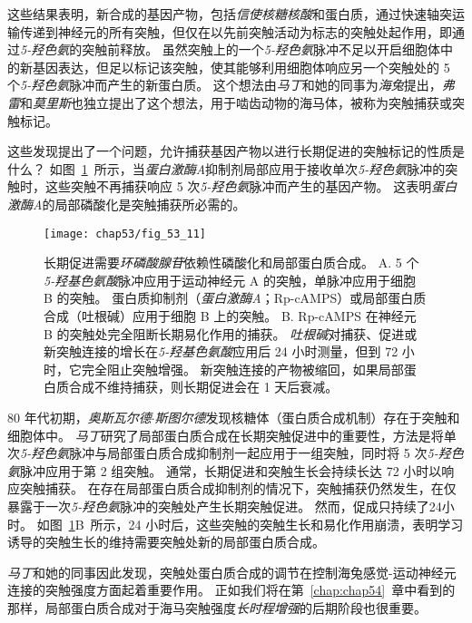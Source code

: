 这些结果表明，新合成的基因产物，包括\textit{信使核糖核酸}和蛋白质，通过快速轴突运输传递到神经元的所有突触，但仅在以先前突触活动为标志的突触处起作用，即通过\textit{5-羟色氨}的突触前释放。
虽然突触上的一个\textit{5-羟色氨}脉冲不足以开启细胞体中的新基因表达，但足以标记该突触，使其能够利用细胞体响应另一个突触处的 5 个\textit{5-羟色氨}脉冲而产生的新蛋白质。
这个想法由\textit{马丁}和她的同事为\textit{海兔}提出，\textit{弗雷}和\textit{莫里斯}也独立提出了这个想法，用于啮齿动物的海马体，被称为突触捕获或突触标记。


这些发现提出了一个问题，允许捕获基因产物以进行长期促进的突触标记的性质是什么？
如图~\ref{fig:53_11}~所示，当\textit{蛋白激酶A}抑制剂局部应用于接收单次\textit{5-羟色氨}脉冲的突触时，这些突触不再捕获响应 5 次\textit{5-羟色氨}脉冲而产生的基因产物。
这表明\textit{蛋白激酶A}的局部磷酸化是突触捕获所必需的。


\begin{figure}[htbp]
	\centering
	\texttt{[image: chap53/fig\_53\_11]}
	\caption{长期促进需要\textit{环磷酸腺苷}依赖性磷酸化和局部蛋白质合成\cite{casadio1999transient}。
		A. 5 个\textit{5-羟基色氨酸}脉冲应用于运动神经元 A 的突触，单脉冲应用于细胞 B 的突触。
		蛋白质抑制剂（\textit{蛋白激酶A}；Rp-cAMPS）或局部蛋白质合成（吐根碱）应用于细胞 B 上的突触。
		B. Rp-cAMPS 在神经元 B 的突触处完全阻断长期易化作用的捕获。
		\textit{吐根碱}对捕获、促进或新突触连接的增长在\textit{5-羟基色氨酸}应用后 24 小时测量，但到 72 小时，它完全阻止突触增强。
		新突触连接的产物被缩回，如果局部蛋白质合成不维持捕获，则长期促进会在 1 天后衰减。}
	\label{fig:53_11}
\end{figure}


80 年代初期，\textit{奥斯瓦尔德$\cdot$斯图尔德}发现核糖体（蛋白质合成机制）存在于突触和细胞体中。
\textit{马丁}研究了局部蛋白质合成在长期突触促进中的重要性，方法是将单次\textit{5-羟色氨}脉冲与局部蛋白质合成抑制剂一起应用于一组突触，同时将 5 次\textit{5-羟色氨}脉冲应用于第 2 组突触。
通常，长期促进和突触生长会持续长达 72 小时以响应突触捕获。
在存在局部蛋白质合成抑制剂的情况下，突触捕获仍然发生，在仅暴露于一次\textit{5-羟色氨}脉冲的突触处产生长期突触促进。
然而，促成只持续了24小时。
如图~\ref{fig:53_11}B~所示，24 小时后，这些突触的突触生长和易化作用崩溃，表明学习诱导的突触生长的维持需要突触处新的局部蛋白质合成。


\textit{马丁}和她的同事因此发现，突触处蛋白质合成的调节在控制海兔感觉-运动神经元连接的突触强度方面起着重要作用。
正如我们将在第~\ref{chap:chap54}~章中看到的那样，局部蛋白质合成对于海马突触强度\textit{长时程增强}的后期阶段也很重要。


